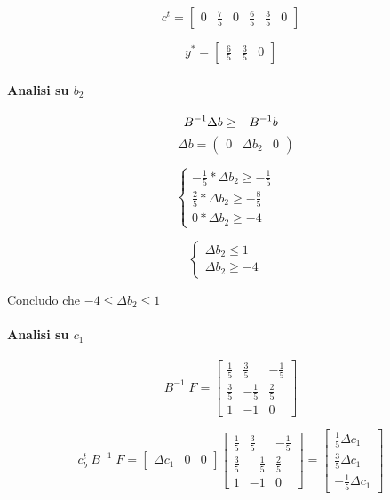 \[
    c^t =
    \begin{bmatrix}
        0 & \frac 7 5 & 0 & \frac 6 5 & \frac 3 5 & 0
    \end{bmatrix}
\]

\[
    y^{*} = 
    \begin{bmatrix}
        \frac 6 5 & \frac 3 5 & 0
    \end{bmatrix}
\]

\paragraph{Analisi su $b_2$}

\[
    B^{-1} \Delta b \geq -B^{-1}b \\
\]
\[
    \;\;\; \Delta b = 
    \begin{pmatrix}
        0 & \Delta b_2 & 0
    \end{pmatrix}
\]

\[
    \begin{cases}
       - \frac 1 5 * \Delta b_2 \geq - \frac 1 5 & \\
       \frac 2 5 * \Delta b_2 \geq - \frac 8 5 & \\
       0 * \Delta b_2 \geq -4 & 
    \end{cases}
\]

\[
    \begin{cases}
       \Delta b_2 \leq 1 & \\
       \Delta b_2 \geq - 4 &
    \end{cases}
\]

Concludo che $-4 \leq \Delta b_2 \leq 1$

\paragraph{Analisi su $c_1$}

\[
    B^{-1} \; F = 
    \begin{bmatrix}
        \frac 1 5 & \frac 3 5 & - \frac 1 5 \\
        \frac 3 5 & - \frac 1 5 & \frac 2 5 \\
        1 & -1 & 0
    \end{bmatrix}
\]

\[
    c^t_b \; B^{-1} \; F =
    \begin{bmatrix}
        \Delta c_1 & 0 & 0
    \end{bmatrix}
    \begin{bmatrix}
        \frac 1 5 & \frac 3 5 & - \frac 1 5 \\
        \frac 3 5 & - \frac 1 5 & \frac 2 5 \\
        1 & -1 & 0
    \end{bmatrix} = 
    \begin{bmatrix}
        \frac 1 5 \Delta c_1 \\
        \frac 3 5 \Delta c_1 \\
        - \frac 1 5 \Delta c_1
    \end{bmatrix}
\]

